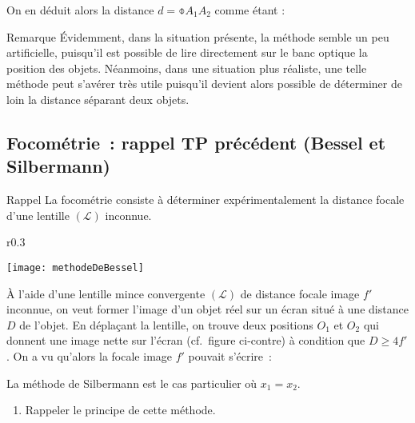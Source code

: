 \documentclass[a4paper, 12pt, final, garamond]{book}
\begin{document}
On en déduit alors la distance $d = \obar{A_1A_2}$ comme étant : 


\begin{NCrema}[width=\linewidth]{Remarque} Évidemment, dans la situation
    présente, la méthode semble un peu artificielle, puisqu'il est possible de
    lire directement sur le banc optique la position des objets. Néanmoins, dans
    une situation plus réaliste, une telle méthode peut s'avérer très utile
    puisqu'il devient alors possible de déterminer de loin la distance séparant
    deux objets. 
\end{NCrema}

\subsection{Focométrie~: rappel TP précédent (Bessel et Silbermann)}

\begin{NCdemo}[width=\linewidth]{Rappel}
    La focométrie consiste à déterminer expérimentalement la distance focale
    d'une lentille $(\mathcal{L})$ inconnue. 
\end{NCdemo}

\begin{wrapfigure}[6]{r}{0.3\textwidth} 
    \vspace*{-37pt}
    \begin{center}
        \texttt{[image: methodeDeBessel]}
    \end{center}
\end{wrapfigure} 

À l'aide d'une lentille mince convergente $(\mathcal{L})$ de distance focale
image $f'$ inconnue, on veut former l'image d'un objet réel sur un écran situé à
une distance $D$ de l'objet. En déplaçant la lentille, on trouve deux positions
$O_1$ et $O_2$ qui donnent une image nette sur l'écran (cf.\ figure ci-contre) à
condition que $D \geq 4f'$. On a vu qu'alors la focale image $f'$ pouvait
s'écrire~: 


La méthode de Silbermann est le cas particulier où $x_1 = x_2$.
\begin{enumerate}[start=2]
    \item Rappeler le principe de cette méthode.
\end{enumerate}
\end{document}
